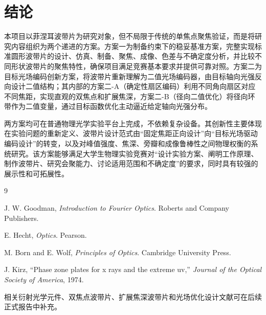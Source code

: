 \documentclass[UTF8,a4paper,11pt]{ctexart}
\begin{document}
\section{结论}

本项目以菲涅耳波带片为研究对象，但不局限于传统的单焦点聚焦验证，而是将研究内容组织为两个递进的方案。方案一为制备约束下的稳妥基准方案，完整实现标准圆形波带片的设计、仿真、制备、聚焦、成像、色差与不确定度分析，并比较不同形状波带片的聚焦特性，确保项目满足竞赛基本要求并提供可靠对照。方案二为目标光场编码创新方案，将波带片重新理解为二值光场编码器，由目标轴向光强反向设计二值结构；其内部的方案二-A（确定性扇区编码）利用不同角向扇区对应不同焦距，实现直观的双焦点和扩展焦深，方案二-B（径向二值优化）将径向环带作为二值变量，通过目标函数优化主动逼近给定轴向光强分布。

两方案均可在普通物理光学实验平台上完成，不依赖复杂设备。其创新性主要体现在实验问题的重新定义、波带片设计范式由“固定焦距正向设计”向“目标光场驱动编码设计”的转变，以及对峰值强度、焦深、旁瓣和成像鲁棒性之间物理权衡的系统研究。该方案能够满足大学生物理实验竞赛对“设计实验方案、阐明工作原理、制作波带片、研究会聚能力、讨论适用范围和不确定度”的要求，同时具有较强的展示性和可拓展性。

\begin{thebibliography}{9}

J. W. Goodman, \textit{Introduction to Fourier Optics}. Roberts and Company Publishers.

E. Hecht, \textit{Optics}. Pearson.

M. Born and E. Wolf, \textit{Principles of Optics}. Cambridge University Press.

J. Kirz, ``Phase zone plates for x rays and the extreme uv,'' \textit{Journal of the Optical Society of America}, 1974.

相关衍射光学元件、双焦点波带片、扩展焦深波带片和光场优化设计文献可在后续正式报告中补充。

\end{thebibliography}
\end{document}
